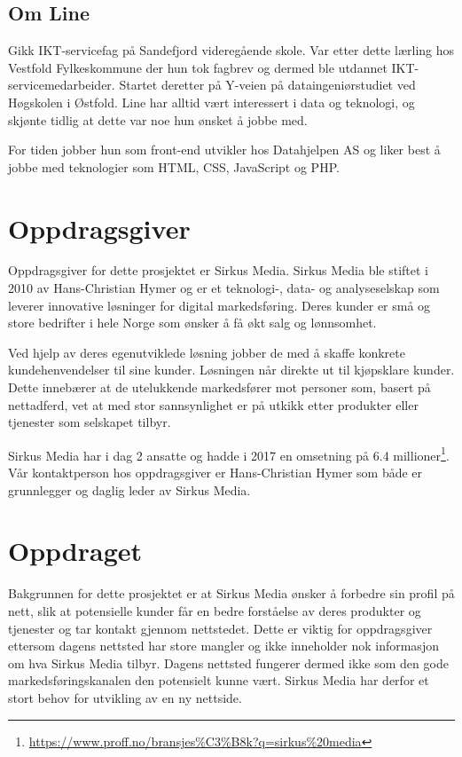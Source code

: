 \subsection{Om Line}
Gikk IKT-servicefag på Sandefjord videregående skole. Var etter dette lærling hos Vestfold Fylkeskommune der hun tok fagbrev og dermed ble utdannet IKT-servicemedarbeider. Startet deretter på Y-veien på dataingeniørstudiet ved Høgskolen i Østfold. Line har alltid vært interessert i data og teknologi, og skjønte tidlig at dette var noe hun ønsket å jobbe med.

For tiden jobber hun som front-end utvikler hos Datahjelpen AS og liker best å jobbe med teknologier som HTML, CSS, JavaScript og PHP.

\section{Oppdragsgiver}
Oppdragsgiver for dette prosjektet er Sirkus Media.
Sirkus Media ble stiftet i 2010 av Hans-Christian Hymer og er et teknologi-, data- og analyseselskap som leverer innovative løsninger for digital markedsføring. Deres kunder er små og store bedrifter i hele Norge som ønsker å få økt salg og lønnsomhet. 

Ved hjelp av deres egenutviklede løsning jobber de med å skaffe konkrete kundehenvendelser til sine kunder. Løsningen når direkte ut til kjøpsklare kunder. Dette innebærer at de utelukkende markedsfører mot personer som, basert på nettadferd, vet at med stor sannsynlighet er på utkikk etter produkter eller tjenester som selskapet tilbyr.

Sirkus Media har i dag 2 ansatte og hadde i 2017 en omsetning på 6.4 millioner\footnote{\url{https://www.proff.no/bransjes\%C3\%B8k?q=sirkus\%20media}}.
Vår kontaktperson hos oppdragsgiver er Hans-Christian Hymer som både er grunnlegger og daglig leder av Sirkus Media. 

\section{Oppdraget}
\label{sec:oppgaven}
Bakgrunnen for dette prosjektet er at Sirkus Media ønsker å forbedre sin profil på nett, slik at potensielle kunder får en bedre forståelse av deres produkter og tjenester og tar kontakt gjennom nettstedet. Dette er viktig for oppdragsgiver ettersom dagens nettsted har store mangler og ikke inneholder nok informasjon om hva Sirkus Media tilbyr. Dagens nettsted fungerer dermed ikke som den gode markedsføringskanalen den potensielt kunne vært. Sirkus Media har derfor et stort behov for utvikling av en ny nettside. 

